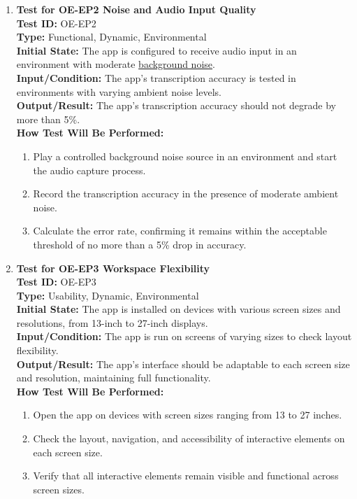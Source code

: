 \documentclass[12pt, titlepage]{article}
\begin{document}
\begin{enumerate}
    \item \textbf{Test for OE-EP2 Noise and Audio Input Quality} \\
      \newline
      \textbf{Test ID:} OE-EP2 \\
      \textbf{Type:} Functional, Dynamic, Environmental \\
      \textbf{Initial State:} The app is configured to receive audio input in an environment with moderate \href{https://github.com/JaakLipp/ScoreGen/tree/main/test/TestingDatasets/noise-samples}{background noise}. \\
      \textbf{Input/Condition:} The app’s transcription accuracy is tested in environments with varying ambient noise levels. \\
      \textbf{Output/Result:} The app’s transcription accuracy should not degrade by more than 5\%. \\
      \textbf{How Test Will Be Performed:}
      \begin{enumerate}
          \item Play a controlled background noise source in an environment and start the audio capture process.
          \item Record the transcription accuracy in the presence of moderate ambient noise.
          \item Calculate the error rate, confirming it remains within the acceptable threshold of no more than a 5\% drop in accuracy.
      \end{enumerate}

    \item \textbf{Test for OE-EP3 Workspace Flexibility} \\
      \newline
      \textbf{Test ID:} OE-EP3 \\
      \textbf{Type:} Usability, Dynamic, Environmental \\
      \textbf{Initial State:} The app is installed on devices with various screen sizes and resolutions, from 13-inch to 27-inch displays. \\
      \textbf{Input/Condition:} The app is run on screens of varying sizes to check layout flexibility. \\
      \textbf{Output/Result:} The app’s interface should be adaptable to each screen size and resolution, maintaining full functionality. \\
      \textbf{How Test Will Be Performed:}
      \begin{enumerate}
          \item Open the app on devices with screen sizes ranging from 13 to 27 inches.
          \item Check the layout, navigation, and accessibility of interactive elements on each screen size.
          \item Verify that all interactive elements remain visible and functional across screen sizes.
      \end{enumerate}


\end{enumerate}
\end{document}
